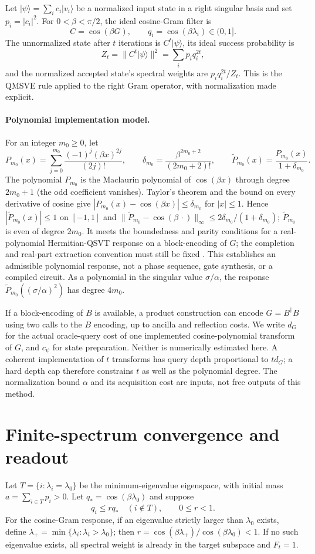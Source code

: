 \documentclass[11pt]{article}
\newcommand{\ket}[1]{\lvert #1\rangle}
\begin{document}
Let $\ket{\psi}=\sum_i c_i\ket{v_i}$ be a normalized input state in a right singular basis and set $p_i=|c_i|^2$. For $0<\beta<\pi/2$, the ideal cosine-Gram filter is
\[
 C=\cos(\beta G),\qquad q_i=\cos(\beta\lambda_i)\in(0,1].
\]
The unnormalized state after $t$ iterations is $C^t\ket{\psi}$, its ideal success probability is
\[
 Z_t=\|C^t\ket{\psi}\|^2=\sum_i p_i q_i^{2t},
\]
and the normalized accepted state's spectral weights are $p_iq_i^{2t}/Z_t$. This is the QMSVE rule applied to the right Gram operator, with normalization made explicit.

\paragraph{Polynomial implementation model.}
For an integer $m_0\geq0$, let
\[
 P_{m_0}(x)=\sum_{j=0}^{m_0}\frac{(-1)^j(\beta x)^{2j}}{(2j)!},
 \qquad
 \delta_{m_0}=\frac{\beta^{2m_0+2}}{(2m_0+2)!},\qquad
 \widetilde P_{m_0}(x)=\frac{P_{m_0}(x)}{1+\delta_{m_0}}.
\]
The polynomial $P_{m_0}$ is the Maclaurin polynomial of $\cos(\beta x)$ through degree $2m_0+1$ (the odd coefficient vanishes). Taylor's theorem and the bound on every derivative of cosine give $|P_{m_0}(x)-\cos(\beta x)|\leq\delta_{m_0}$ for $|x|\leq1$. Hence $|\widetilde P_{m_0}(x)|\leq1$ on $[-1,1]$ and $\|\widetilde P_{m_0}-\cos(\beta\,\cdot)\|_\infty\leq2\delta_{m_0}/(1+\delta_{m_0})$; $\widetilde P_{m_0}$ is even of degree $2m_0$. It meets the boundedness and parity conditions for a real-polynomial Hermitian-QSVT response on a block-encoding of $G$; the completion and real-part extraction convention must still be fixed \cite{Gilyen}. This establishes an admissible polynomial response, not a phase sequence, gate synthesis, or a compiled circuit. As a polynomial in the singular value $\sigma/\alpha$, the response $\widetilde P_{m_0}((\sigma/\alpha)^2)$ has degree $4m_0$.

If a block-encoding of $B$ is available, a product construction can encode $G=B^\dagger B$ using two calls to the $B$ encoding, up to ancilla and reflection costs. We write $d_G$ for the actual oracle-query cost of one implemented cosine-polynomial transform of $G$, and $c_\psi$ for state preparation. Neither is numerically estimated here. A coherent implementation of $t$ transforms has query depth proportional to $t d_G$; a hard depth cap therefore constrains $t$ as well as the polynomial degree. The normalization bound $\alpha$ and its acquisition cost are inputs, not free outputs of this method.

\section{Finite-spectrum convergence and readout}
Let $T=\{i:\lambda_i=\lambda_0\}$ be the minimum-eigenvalue eigenspace, with initial mass $a=\sum_{i\in T}p_i>0$. Let $q_*=\cos(\beta\lambda_0)$ and suppose
\[
 q_i\leq r q_*\quad(i\notin T),\qquad 0\leq r<1.
\]
For the cosine-Gram response, if an eigenvalue strictly larger than $\lambda_0$ exists, define $\lambda_+=\min\{\lambda_i:\lambda_i>\lambda_0\}$; then $r=\cos(\beta\lambda_+)/\cos(\beta\lambda_0)<1$. If no such eigenvalue exists, all spectral weight is already in the target subspace and $F_t=1$.
\end{document}
